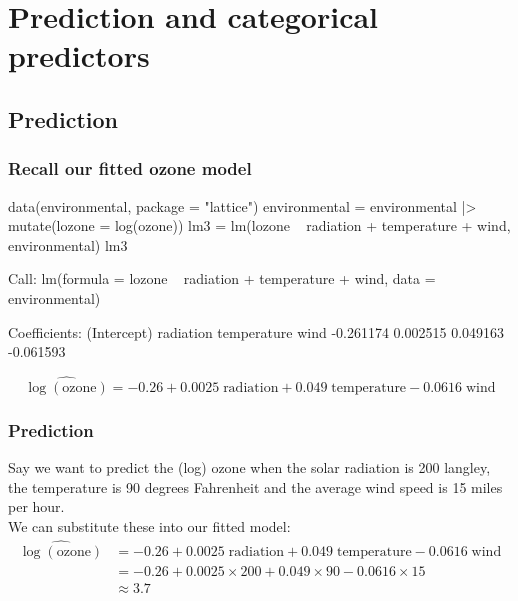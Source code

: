 \documentclass[a4paper]{article}\usepackage[]{graphicx}\usepackage[]{xcolor}
\begin{document}
\section{Prediction and categorical predictors}\label{sec:28}
\subsection{Prediction}
\subsubsection{Recall our fitted ozone model}
\begin{Schunk}
\begin{Sinput}
data(environmental, package = "lattice")
environmental = environmental |> 
  mutate(lozone = log(ozone))
lm3 = lm(lozone ~ radiation + temperature + wind, environmental)
lm3
\end{Sinput}
\begin{Soutput}

Call:
lm(formula = lozone ~ radiation + temperature + wind, data = environmental)

Coefficients:
(Intercept)    radiation  temperature         wind  
  -0.261174     0.002515     0.049163    -0.061593  
\end{Soutput}
\end{Schunk}
\[
	\widehat{\log(\text{ozone})} = -0.26 + 0.0025\; \text{radiation} + 0.049\; \text{temperature} - 0.0616\; \text{wind}
\]
\subsubsection{Prediction}
Say we want to predict the (log) ozone when the solar radiation is 200 langley, the temperature is 90 degrees Fahrenheit and the average wind speed is 15 miles per hour.\\
We can substitute these into our fitted model:
\begin{align*}
	\widehat{\log(\text{ozone})} &= -0.26 + 0.0025\; \text{radiation} + 0.049\; \text{temperature} - 0.0616\; \text{wind}\\
	& = -0.26 + 0.0025\times 200 + 0.049\times 90 - 0.0616\times 15 \\
	& \approx 3.7
\end{align*}
\end{document}
